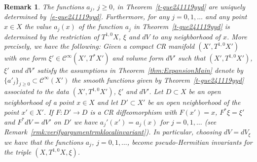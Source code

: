 \documentclass[12pt]{amsart}
\newtheorem{remark}[theorem]{Remark}
\theoremstyle{definition}
\theoremstyle{named}
\numberwithin{equation}{subsection}
\def\cC{\mathscr{C}}
\begin{document}
\begin{remark}\label{rmk:ajLocalInvariants}
	The functions \(a_j\), \(j\geq 0\), in Theorem~\ref{t-gue241119yyd} are uniquely determined by~\eqref{e-gue241119yyd}.
		Furthermore, for any \(j=0,1,\ldots\) and any point \(x\in X\) the value \(a_j(x)\) of the function \(a_j\) in Theorem~\ref{t-gue241119yyd} is determined by the restriction of \(T^{1,0}X\), \(\xi\) and \(dV\) to any neighborhood of \(x\). More precisely, we have the following: Given a compact CR manifold \((X',T^{1,0}X')\) with one form $\xi'\in\cC^\infty(X',T^*X')$ and volume form \(dV'\) such that \((X',T^{1,0}X')\),  \(\xi'\) and \(dV'\) satisfy the assumptions in Theorem~\ref{thm:ExpansionMain} denote by \(\{a'_j\}_{j\geq0}\subset \mathscr{C}^\infty(X')\) the smooth functions given by Theorem~\ref{t-gue241119yyd} associated to the data  \((X',T^{1,0}X')\), \(\xi'\) and \(dV'\). Let \(D\subset X\) be an open neighborhood of a point \(x\in X\) and let \(D'\subset X'\) be an open neighborhood of the point \(x'\in X'\). If  \(F\colon D'\to D\) is a CR diffeomorphism   with \(F(x')=x\), \(F^*\xi=\xi'\) and \(F^*dV=dV'\) on \(D'\) we have \(a_j'(x')=a_j(x)\) for \(j=0,1,\ldots\) (see Remark~\ref{rmk:verifyargumentrmklocalinvariant}). In particular, choosing \(dV=dV_\xi\) we have that the functions \(a_j\), \(j=0,1,\ldots\), become pseudo-Hermitian invariants for the triple \((X,T^{1,0}X,\xi)\).  
\end{remark}
\end{document}
